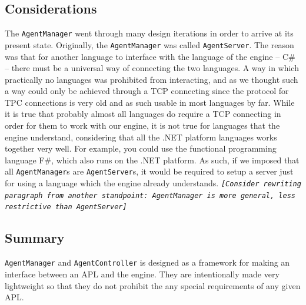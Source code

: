\subsection*{Considerations}

The \texttt{AgentManager} went through many design iterations in order
to arrive at its present state. Originally, the \texttt{AgentManager}
was called \texttt{AgentServer}. The reason was that for another language
to interface with the language of the engine -- C\# -- there must
be a universal way of connecting the two languages. A way in which
practically no languages was prohibited from interacting, and as we
thought such a way could only be achieved through a TCP connecting
since the protocol for TPC connections is very old and as such usable
in most languages by far. While it is true that probably almost all
languages do require a TCP connecting in order for them to work with
our engine, it is not true for languages that the engine understand,
considering that all the .NET platform languages works together very
well. For example, you could use the functional programming language
F\#, which also runs on the .NET platform. As such, if we imposed
that all \texttt{AgentManager}s are \texttt{AgentServer}s, it would
be required to setup a server just for using a language which the
engine already understands. \texttt{\emph{{[}Consider rewriting paragraph
from another standpoint: AgentManager is more general, less restrictive
than AgentServer{]}}}


\subsection*{Summary}

\texttt{AgentManager} and \texttt{AgentController} is designed as
a framework for making an interface between an APL and the engine.
They are intentionally made very lightweight so that they do not prohibit
the any special requirements of any given APL.

